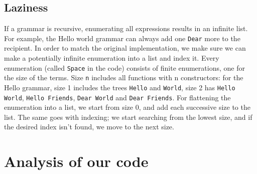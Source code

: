 \documentclass[]{article}
\newenvironment{Shaded}{\begin{snugshade}}{\end{snugshade}}
\newcommand{\KeywordTok}[1]{\textcolor[rgb]{0.13,0.29,0.53}{\textbf{{#1}}}}
\newcommand{\DataTypeTok}[1]{\textcolor[rgb]{0.13,0.29,0.53}{{#1}}}
\newcommand{\CommentTok}[1]{\textcolor[rgb]{0.56,0.35,0.01}{\textit{{#1}}}}
\newcommand{\OtherTok}[1]{\textcolor[rgb]{0.56,0.35,0.01}{{#1}}}
\newcommand{\FunctionTok}[1]{\textcolor[rgb]{0.00,0.00,0.00}{{#1}}}
\newcommand{\NormalTok}[1]{{#1}}
\begin{document}
\begin{Shaded}
\end{Shaded}

\subsection{Laziness}\label{laziness}

If a grammar is recursive, enumerating all expressions results in an
infinite list. For example, the Hello world grammar can always add one
\texttt{Dear} more to the recipient. In order to match the original
implementation, we make sure we can make a potentially infinite
enumeration into a list and index it. Every enumeration (called
\texttt{Space} in the code) consists of finite enumerations, one for the
size of the terms. Size \texttt{n} includes all functions with n
constructors: for the Hello grammar, size 1 includes the trees
\texttt{Hello} and \texttt{World}, size 2 has \texttt{Hello World},
\texttt{Hello Friends}, \texttt{Dear World} and \texttt{Dear Friends}.
For flattening the enumeration into a list, we start from size 0, and
add each successive size to the list. The same goes with indexing; we
start searching from the lowest size, and if the desired index isn't
found, we move to the next size.

\section{Analysis of our code}\label{analysis-of-our-code}
\end{document}
